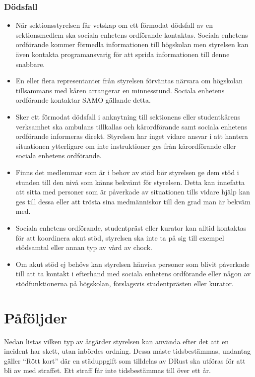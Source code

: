 \documentclass[a4paper]{dtek}
\begin{document}
\subsubsection{Dödsfall}
\begin{itemize}
    \item När sektionsstyrelsen får vetskap om ett förmodat dödsfall av en sektionsmedlem ska sociala  enhetens ordförande kontaktas. Sociala enhetens ordförande kommer förmedla  informationen till högskolan men styrelsen kan även kontakta programansvarig för att sprida  informationen till denne snabbare.
    \item En eller flera representanter från styrelsen förväntas närvara om högskolan tillsammans med kåren arrangerar en minnesstund. Sociala enhetens ordförande kontaktar SAMO gällande detta.
    \item Sker ett förmodat dödsfall i anknytning till sektionens eller studentkårens verksamhet ska ambulans tillkallas och kårordförande samt sociala enhetens ordförande informeras direkt. Styrelsen har inget vidare ansvar i att hantera situationen ytterligare om inte instruktioner ges från  kårordförande eller sociala enhetens ordförande.
    \item Finns det medlemmar som är i behov av stöd bör styrelsen ge dem stöd i stunden till den nivå  som känns bekvämt för styrelsen. Detta kan innefatta att sitta med personer som är  påverkade av situationen tills vidare hjälp kan ges till dessa eller att trösta sina medmänniskor till den grad man är bekväm med.
    \item Sociala enhetens ordförande, studentpräst eller kurator kan alltid kontaktas för att koordinera akut stöd, styrelsen ska inte ta på sig till exempel stödsamtal eller annan typ av vård av chock.
    \item Om akut stöd ej behövs kan styrelsen hänvisa personer som blivit påverkade till att ta kontakt i efterhand med sociala enhetens ordförande eller någon av stödfunktionerna på högskolan, förslagsvis studentprästen eller kurator.  
\end{itemize}

\section{Påföljder}
Nedan listas vilken typ av åtgärder styrelsen kan använda efter det att en incident har skett, utan inbördes ordning. Dessa måste tidsbestämmas, undantag gäller ``Rött kort'' där en städuppgift som tilldelas av DRust ska utföras för att bli av med straffet. Ett straff får inte tidsbestämmas till över ett år.
\end{document}
